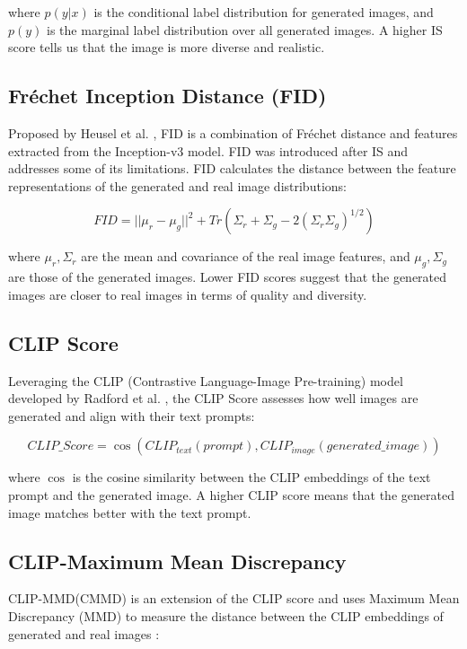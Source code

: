 \documentclass{article}
\begin{document}
where $p(y|x)$ is the conditional label distribution for generated images, and $p(y)$ is the marginal label distribution over all generated images.
A higher IS score tells us that the image is more diverse and realistic.


\subsection{Fréchet Inception Distance (FID)}

Proposed by Heusel et al. \cite{heusel2017gans}, FID is a combination of Fréchet distance and features extracted from the 
Inception-v3 model. FID was introduced after IS and addresses some of its limitations.
FID calculates the distance between the feature representations of the generated and real image distributions:

\begin{equation}
    FID = ||\mu_r - \mu_g||^2 + Tr(\Sigma_r + \Sigma_g - 2(\Sigma_r \Sigma_g)^{1/2})
\end{equation}

where $\mu_r, \Sigma_r$ are the mean and covariance of the real image features, and $\mu_g, \Sigma_g$ are those of the generated images.
 Lower FID scores suggest that the generated images are closer to real images in terms of quality and diversity.

\subsection{CLIP Score}

Leveraging the CLIP (Contrastive Language-Image Pre-training) model developed by Radford et al. \cite{radford2021learning}, 
the CLIP Score assesses how well images are generated and align with their text prompts:

\begin{equation}
    CLIP\_Score = \cos(CLIP_{text}(prompt), CLIP_{image}(generated\_image))
\end{equation}

where $\cos$ is the cosine similarity between the CLIP embeddings of the text prompt and the generated image.
A higher CLIP score means that the generated image matches better with the text prompt.

\subsection{CLIP-Maximum Mean Discrepancy}

CLIP-MMD(CMMD) is an extension of the CLIP score and uses Maximum Mean Discrepancy (MMD) to measure the distance between the 
CLIP embeddings of generated and real images \cite{gao2022measuring}:
\end{document}

